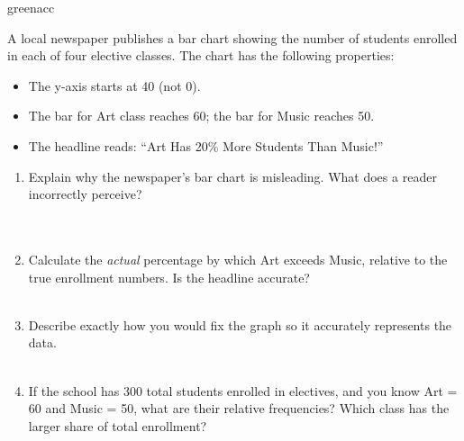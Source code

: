 \documentclass[10pt]{article}
\begin{document}
\vspace{0.14in}

\begin{blurbbox}{greenacc}
\small

A local newspaper publishes a bar chart showing the number of students enrolled
in each of four elective classes. The chart has the following properties:
\begin{itemize}[itemsep=3pt]
  \item The y-axis starts at 40 (not 0).
  \item The bar for Art class reaches 60; the bar for Music reaches 50.
  \item The headline reads: ``Art Has 20\% More Students Than Music!''
\end{itemize}

\vspace{10pt}

\begin{enumerate}[leftmargin=1.5em, itemsep=8pt]
  \item Explain why the newspaper's bar chart is misleading. What does a reader
        incorrectly perceive?\\[6pt]
        \writeline\\[1pt]\writeline\\[1pt]\writeline

  \item Calculate the \textit{actual} percentage by which Art exceeds Music,
        relative to the true enrollment numbers. Is the headline accurate?\\[8pt]
        \writeline\\[1pt]\writeline

  \item Describe exactly how you would fix the graph so it accurately represents
        the data.\\[6pt]
        \writeline\\[1pt]\writeline

  \item If the school has 300 total students enrolled in electives, and you
        know Art = 60 and Music = 50, what are their relative frequencies?
        Which class has the larger share of total enrollment?\\[6pt]
        \writeline\\[1pt]\writeline
\end{enumerate}

\end{blurbbox}
\end{document}
